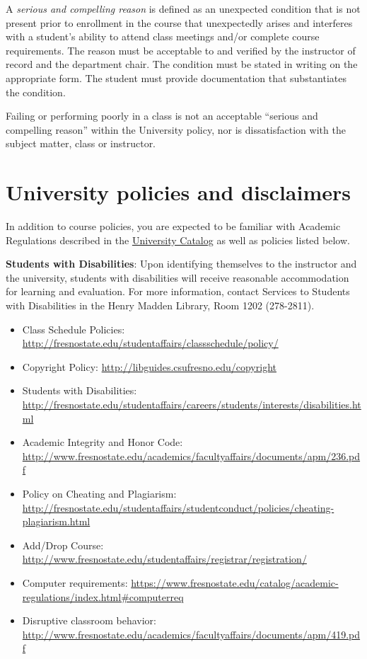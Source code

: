 A \emph{serious and compelling reason} is defined as an unexpected
condition that is not present prior to enrollment in the course that
unexpectedly arises and interferes with a student's ability to attend
class meetings and/or complete course requirements. The reason must be
acceptable to and verified by the instructor of record and the
department chair. The condition must be stated in writing on the
appropriate form. The student must provide documentation that
substantiates the condition.

Failing or performing poorly in a class is not an acceptable ``serious
and compelling reason'' within the University policy, nor is
dissatisfaction with the subject matter, class or instructor.

\hypertarget{university-policies-and-disclaimers}{%
\section{University policies and
disclaimers}\label{university-policies-and-disclaimers}}

In addition to course policies, you are expected to be familiar with
Academic Regulations described in the
\href{http://www.fresnostate.edu/catalog/academic-regulations/}{University
Catalog} as well as policies listed below.

\textbf{Students with Disabilities}: Upon identifying themselves to the
instructor and the university, students with disabilities will receive
reasonable accommodation for learning and evaluation. For more
information, contact Services to Students with Disabilities in the Henry
Madden Library, Room 1202 (278-2811).

\begin{itemize}
\tightlist
\item
  Class Schedule Policies:
  \url{http://fresnostate.edu/studentaffairs/classschedule/policy/}
\item
  Copyright Policy: \url{http://libguides.csufresno.edu/copyright}
\item
  Students with Disabilities:
  \url{http://fresnostate.edu/studentaffairs/careers/students/interests/disabilities.html}
\item
  Academic Integrity and Honor Code:
  \url{http://www.fresnostate.edu/academics/facultyaffairs/documents/apm/236.pdf}
\item
  Policy on Cheating and Plagiarism:
  \url{http://fresnostate.edu/studentaffairs/studentconduct/policies/cheating-plagiarism.html}
\item
  Add/Drop Course:
  \url{http://www.fresnostate.edu/studentaffairs/registrar/registration/}
\item
  Computer requirements:
  \url{https://www.fresnostate.edu/catalog/academic-regulations/index.html\#computerreq}
\item
  Disruptive classroom behavior:
  \url{http://www.fresnostate.edu/academics/facultyaffairs/documents/apm/419.pdf}
\end{itemize}


